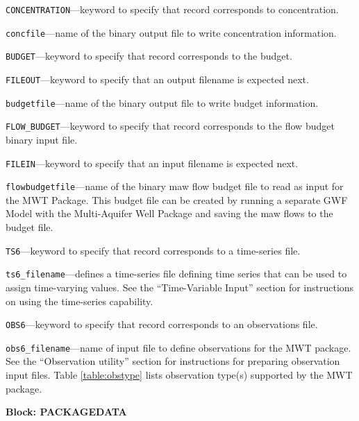 \begin{description}
\item \texttt{CONCENTRATION}---keyword to specify that record corresponds to concentration.

\item \texttt{concfile}---name of the binary output file to write concentration information.

\item \texttt{BUDGET}---keyword to specify that record corresponds to the budget.

\item \texttt{FILEOUT}---keyword to specify that an output filename is expected next.

\item \texttt{budgetfile}---name of the binary output file to write budget information.

\item \texttt{FLOW\_BUDGET}---keyword to specify that record corresponds to the flow budget binary input file.

\item \texttt{FILEIN}---keyword to specify that an input filename is expected next.

\item \texttt{flowbudgetfile}---name of the binary maw flow budget file to read as input for the MWT Package.  This budget file can be created by running a separate GWF Model with the Multi-Aquifer Well Package and saving the maw flows to the budget file.

\item \texttt{TS6}---keyword to specify that record corresponds to a time-series file.

\item \texttt{ts6\_filename}---defines a time-series file defining time series that can be used to assign time-varying values. See the ``Time-Variable Input'' section for instructions on using the time-series capability.

\item \texttt{OBS6}---keyword to specify that record corresponds to an observations file.

\item \texttt{obs6\_filename}---name of input file to define observations for the MWT package. See the ``Observation utility'' section for instructions for preparing observation input files. Table \ref{table:obstype} lists observation type(s) supported by the MWT package.

\end{description}
\item \textbf{Block: PACKAGEDATA}

